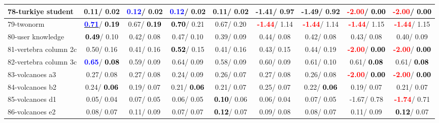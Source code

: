 \begin{table}[h]
\begin{center}
\begin{tabular}{lc|c|c|c|c|c|c|c}
78-turkiye student &   0.11/  0.02 & \textcolor{blue}{\textbf{  0.12}}/  0.02 & \textcolor{blue}{\textbf{  0.12}}/  0.02 &   0.11/  0.02 &  -1.41/  0.97 &  -1.49/  0.92 & \textcolor{red}{\textbf{ -2.00}}/\textcolor{black}{\textbf{  0.00}} & \textcolor{red}{\textbf{ -2.00}}/\textcolor{black}{\textbf{  0.00}} \\ \hline
79-twonorm & \underline{\textcolor{blue}{\textbf{  0.71}}}/\textcolor{black}{\textbf{  0.19}} &   0.67/\textcolor{black}{\textbf{  0.19}} & \textcolor{black}{\textbf{  0.70}}/  0.21 &   0.67/  0.20 & \textcolor{red}{\textbf{ -1.44}}/  1.14 & \textcolor{red}{\textbf{ -1.44}}/  1.14 & \textcolor{red}{\textbf{ -1.44}}/  1.15 & \textcolor{red}{\textbf{ -1.44}}/  1.15 \\
80-user knowledge & \textcolor{black}{\textbf{  0.49}}/  0.10 &   0.42/  0.08 &   0.47/  0.10 &   0.39/  0.09 &   0.44/  0.08 &   0.42/  0.08 &   0.43/  0.08 &   0.40/  0.09 \\
81-vertebra column 2c &   0.50/  0.16 &   0.41/  0.16 & \textcolor{black}{\textbf{  0.52}}/  0.15 &   0.41/  0.16 &   0.43/  0.15 &   0.44/  0.19 & \textcolor{red}{\textbf{ -2.00}}/\textcolor{black}{\textbf{  0.00}} & \textcolor{red}{\textbf{ -2.00}}/\textcolor{black}{\textbf{  0.00}} \\
82-vertebra column 3c & \textcolor{blue}{\textbf{  0.65}}/\textcolor{black}{\textbf{  0.08}} &   0.59/  0.09 &   0.64/  0.09 &   0.58/  0.09 &   0.60/  0.09 &   0.61/  0.10 &   0.61/\textcolor{black}{\textbf{  0.08}} &   0.61/\textcolor{black}{\textbf{  0.08}} \\
83-volcanoes a3 &   0.27/  0.08 &   0.27/  0.08 &   0.24/  0.09 &   0.26/  0.07 &   0.27/  0.08 &   0.26/  0.08 & \textcolor{red}{\textbf{ -2.00}}/\textcolor{black}{\textbf{  0.00}} & \textcolor{red}{\textbf{ -2.00}}/\textcolor{black}{\textbf{  0.00}} \\
84-volcanoes b2 &   0.24/\textcolor{black}{\textbf{  0.06}} &   0.19/  0.07 &   0.21/\textcolor{black}{\textbf{  0.06}} &   0.21/  0.07 &   0.25/  0.07 &   0.22/\textcolor{black}{\textbf{  0.06}} &   0.19/  0.07 &   0.21/  0.07 \\
85-volcanoes d1 &   0.05/  0.04 &   0.07/  0.05 &   0.06/  0.05 & \textcolor{black}{\textbf{  0.10}}/  0.06 &   0.06/  0.04 &   0.07/  0.05 &  -1.67/  0.78 & \textcolor{red}{\textbf{ -1.74}}/  0.71 \\ \hline
86-volcanoes e2 &   0.08/  0.07 &   0.11/  0.09 &   0.07/  0.07 & \textcolor{black}{\textbf{  0.12}}/  0.07 &   0.09/  0.08 &   0.08/  0.07 &   0.11/  0.09 & \textcolor{black}{\textbf{  0.12}}/  0.07 \\

\end{tabular}
\end{center}
\end{table}
